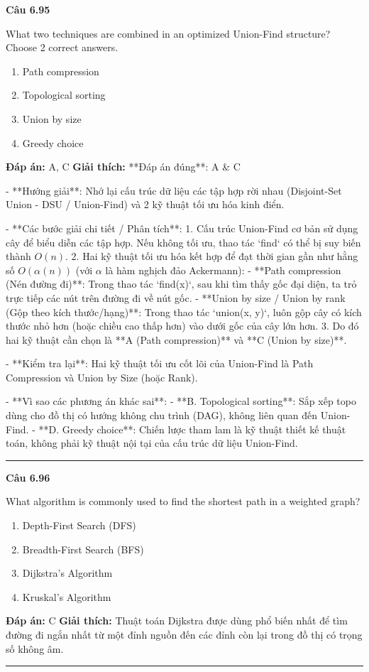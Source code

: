 \documentclass[11pt,a4paper]{article}
\newenvironment{question}[1]{%
  \par\vspace{1em}\noindent\textbf{\large Câu #1}\par\vspace{0.4em}
}{%
  \par\vspace{1em}\hrule\vspace{0.6em}
}
\newenvironment{choices}{%
  \begin{enumerate}[label=\textbf{\Alph*.},leftmargin=2.2em,itemsep=2pt,topsep=3pt]
}{%
  \end{enumerate}
}
\newcommand{\choice}{\item}
\begin{document}
\begin{question}{6.95}
What two techniques are combined in an optimized Union-Find structure? Choose 2 correct answers.
\begin{choices}
\choice Path compression
\choice Topological sorting
\choice Union by size
\choice Greedy choice
\end{choices}
\textbf{Đáp án:} A, C
\textbf{Giải thích:} **Đáp án đúng**: A & C

- **Hướng giải**:
  Nhớ lại cấu trúc dữ liệu các tập hợp rời nhau (Disjoint-Set Union - DSU / Union-Find) và 2 kỹ thuật tối ưu hóa kinh điển.

- **Các bước giải chi tiết / Phân tích**:
  1. Cấu trúc Union-Find cơ bản sử dụng cây để biểu diễn các tập hợp. Nếu không tối ưu, thao tác `find` có thể bị suy biến thành \(O(n)\).
  2. Hai kỹ thuật tối ưu hóa kết hợp để đạt thời gian gần như hằng số \(O(\alpha(n))\) (với \(\alpha\) là hàm nghịch đảo Ackermann):
     - **Path compression (Nén đường đi)**: Trong thao tác `find(x)`, sau khi tìm thấy gốc đại diện, ta trỏ trực tiếp các nút trên đường đi về nút gốc.
     - **Union by size / Union by rank (Gộp theo kích thước/hạng)**: Trong thao tác `union(x, y)`, luôn gộp cây có kích thước nhỏ hơn (hoặc chiều cao thấp hơn) vào dưới gốc của cây lớn hơn.
  3. Do đó hai kỹ thuật cần chọn là **A (Path compression)** và **C (Union by size)**.

- **Kiểm tra lại**:
  Hai kỹ thuật tối ưu cốt lõi của Union-Find là Path Compression và Union by Size (hoặc Rank).

- **Vì sao các phương án khác sai**:
  - **B. Topological sorting**: Sắp xếp topo dùng cho đồ thị có hướng không chu trình (DAG), không liên quan đến Union-Find.
  - **D. Greedy choice**: Chiến lược tham lam là kỹ thuật thiết kế thuật toán, không phải kỹ thuật nội tại của cấu trúc dữ liệu Union-Find.
\end{question}

\begin{question}{6.96}
What algorithm is commonly used to find the shortest path in a weighted graph?
\begin{choices}
\choice Depth-First Search (DFS)
\choice Breadth-First Search (BFS)
\choice Dijkstra's Algorithm
\choice Kruskal's Algorithm
\end{choices}
\textbf{Đáp án:} C
\textbf{Giải thích:} Thuật toán Dijkstra được dùng phổ biến nhất để tìm đường đi ngắn nhất từ một đỉnh nguồn đến các đỉnh còn lại trong đồ thị có trọng số không âm.
\end{question}
\end{document}
